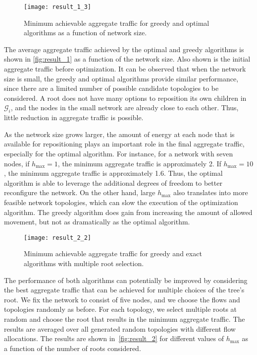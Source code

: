 \documentclass[10pt,conference]{IEEEtran}
\begin{document}
\begin{figure} \centering
 \texttt{[image: result\_1\_3]}
 \caption{Minimum achievable aggregate traffic for greedy and optimal
   algorithms as a function of network size.}
 \label{fig:result_1}
\end{figure}

The average aggregate traffic achieved by the optimal and greedy
algorithms is shown in \autoref{fig:result_1} as a function of the
network size.  Also shown is the initial aggregate traffic before
optimization.  It can be observed that when the network size is small,
the greedy and optimal algorithms provide similar performance, since
there are a limited number of possible candidate topologies
to be considered. A root does not have many options to reposition its own
children in $\mathcal{G}_{i}$, and the nodes in the small network are
already close to each other.   Thus, little reduction in aggregate
traffic is possible.

As the network size grows larger, the amount of energy at each node
that is available for repositioning plays an important role in the
final aggregate traffic, especially for the optimal algorithm.  For
instance, for a network with seven nodes, if $h_{\max}=1$, the minimum
aggregate traffic is approximately 2.  If $h_{\max}=10$, the minimum
aggregate traffic is approximately 1.6.  Thus, the optimal algorithm
is able to leverage the additional degrees of freedom to better
reconfigure the network.  On the other hand, large $h_{\max}$ also
translates into more feasible network topologies, which can slow the
execution of the optimization algorithm.  The greedy algorithm does gain
from increasing the amount of allowed movement, but not as dramatically as the
optimal algorithm.

\begin{figure} \centering
 \texttt{[image: result\_2\_2]}
 \caption{Minimum achievable aggregate traffic for greedy and exact
   algorithms with multiple root selection.}
 \label{fig:result_2}
\end{figure}

The performance of both algorithms can potentially be improved by
considering the best aggregate traffic that can be achieved for
multiple choices of the tree's root.  We fix the network to consist of
five nodes, and we choose the flows and topologies randomly as before.
For each topology, we select multiple roots at random and choose the
root that results in the minimum aggregate traffic. The results are
averaged over all generated random topologies with different flow
allocations. The results are shown in~\autoref{fig:result_2} for
different values of $h_{\max}$ as a function of the number of roots
considered.
\end{document}
